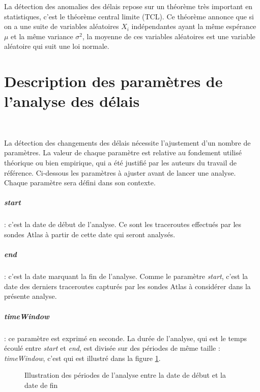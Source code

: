 La détection des anomalies des délais repose sur un théorème très important en statistiques, c'est le théorème  central limite (TCL). Ce théorème  annonce que si on a une suite de variables aléatoires $X_i$ indépendantes ayant la même espérance $\mu$ et la même variance $\sigma^2$, la moyenne de ces variables aléatoires est une variable aléatoire qui suit une loi normale. 




\section{Description des paramètres de l'analyse des délais} \label{par:parametre-de-lanalyse}~

La détection des changements des délais nécessite l'ajustement d'un nombre de paramètres. La valeur de chaque paramètre est relative au  fondement utilisé théorique ou bien empirique, qui a été  justifié par les auteurs du travail de référence.   Ci-dessous les paramètres à ajuster avant de lancer une analyse.  Chaque paramètre sera défini dans son contexte.

\subparagraph{start} : c'est la date de début de l'analyse. Ce sont les traceroutes effectués par les sondes Atlas à partir de cette date qui seront analysés.

\subparagraph{end} : c'est la date marquant la fin de l'analyse. Comme le paramètre \textit{start}, c'est la date des derniers traceroutes capturés par les sondes Atlas à considérer dans la présente analyse.

\subparagraph{timeWindow} :  ce paramètre est exprimé en seconde. La durée de l'analyse, qui est le temps écoulé entre \textit{start} et \textit{end}, est divisée sur des périodes de même taille : \textit{timeWindow}, c'est qui est illustré dans la figure  \ref{fig:timing_tex}.




\begin{figure}[h]
	\centering
	\captionsetup{justification=centering}
	
	\caption{Illustration des périodes de l'analyse entre la date de début et la date de fin}
	\label{fig:timing_tex}
\end{figure}
%		 

